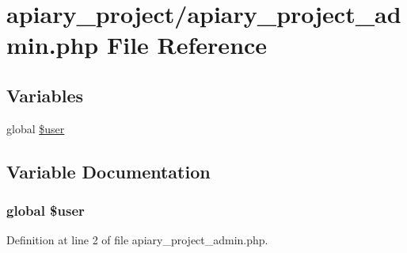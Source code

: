 \hypertarget{apiary__project__admin_8php}{
\section{apiary_project/apiary\_\-project\_\-admin.php File Reference}
\label{apiary__project__admin_8php}
}
\subsection*{Variables}
\begin{DoxyCompactItemize}
\item 
global \hyperlink{apiary__project__admin_8php_a00365e6c5f70c43fb2ed86c9bc5626e0}{\$user}
\end{DoxyCompactItemize}


\subsection{Variable Documentation}
\hypertarget{apiary__project__admin_8php_a00365e6c5f70c43fb2ed86c9bc5626e0}{
\subsubsection[{\$user}]{\setlength{\rightskip}{0pt plus 5cm}global \$user}}
\label{apiary__project__admin_8php_a00365e6c5f70c43fb2ed86c9bc5626e0}


Definition at line 2 of file apiary\_\-project\_\-admin.php.

